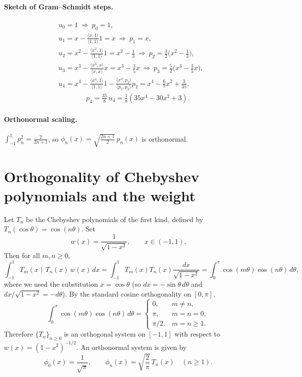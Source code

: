 \documentclass[11pt,a4paper]{article}
\theoremstyle{definition}
\theoremstyle{definition}
\theoremstyle{plain}
\theoremstyle{remark}
\begin{document}
\paragraph{Sketch of Gram--Schmidt steps.}
\[
\begin{aligned}
	&u_0=1\ \Rightarrow\ p_0=1,\\[2pt]
	&u_1=x-\frac{\langle x,1\rangle}{\langle 1,1\rangle}1=x\ \Rightarrow\ p_1=x,\\[2pt]
	&u_2=x^2-\frac{\langle x^2,1\rangle}{\langle 1,1\rangle}1=x^2-\tfrac13\ \Rightarrow\
	p_2=\tfrac32\bigl(x^2-\tfrac13\bigr),\\[2pt]
	&u_3=x^3-\frac{\langle x^3,x\rangle}{\langle x,x\rangle}x=x^3-\tfrac35 x\
	\Rightarrow\ p_3=\tfrac52\bigl(x^3-\tfrac35 x\bigr),\\[2pt]
	&u_4=x^4-\frac{\langle x^4,1\rangle}{\langle 1,1\rangle}1
	-\frac{\langle x^4,p_2\rangle}{\langle p_2,p_2\rangle}p_2
	=x^4-\tfrac{6}{7}x^2+\tfrac{3}{35},\\
	&\hspace{48pt}p_4=\frac{35}{8}\,u_4=\tfrac18(35x^4-30x^2+3).
\end{aligned}
\]

\paragraph{Orthonormal scaling.}
\(\displaystyle \int_{-1}^{1}p_n^2=\frac{2}{2n+1}\), so
\(\displaystyle \phi_n(x)=\sqrt{\frac{2n+1}{2}}\,p_n(x)\) is orthonormal.

\section*{Orthogonality of Chebyshev polynomials and the weight}
Let \(T_n\) be the Chebyshev polynomials of the first kind, defined by \(T_n(\cos\theta)=\cos(n\theta)\).
Set
\[
w(x)=\frac{1}{\sqrt{1-x^2}},\qquad x\in(-1,1).
\]
Then for all \(m,n\ge 0\),
\[
\int_{-1}^{1} T_m(x)\,T_n(x)\,w(x)\,dx
= \int_{-1}^{1} T_m(x)T_n(x)\frac{dx}{\sqrt{1-x^2}}
= \int_{0}^{\pi} \cos(m\theta)\cos(n\theta)\,d\theta,
\]
where we used the substitution \(x=\cos\theta\) (so \(dx=-\sin\theta\,d\theta\) and
\(dx/\sqrt{1-x^2}=-d\theta\)).
By the standard cosine orthogonality on \([0,\pi]\),
\[
\int_{0}^{\pi} \cos(m\theta)\cos(n\theta)\,d\theta=
\begin{cases}
	0, & m\ne n,\\
	\pi, & m=n=0,\\
	\pi/2, & m=n\ge 1.
\end{cases}
\]
Therefore \(\{T_n\}_{n\ge0}\) is an orthogonal system on \([-1,1]\) with respect to
\(w(x)=(1-x^2)^{-1/2}\). An orthonormal system is given by
\[
\phi_0(x)=\frac{1}{\sqrt{\pi}},\qquad
\phi_n(x)=\sqrt{\frac{2}{\pi}}\,T_n(x)\quad(n\ge1).
\]
\end{document}
